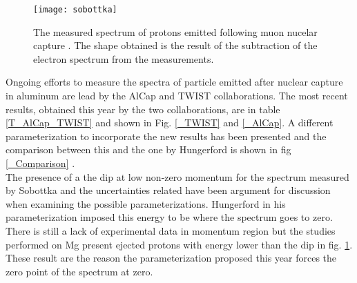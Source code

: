\documentclass[12pt,a4paper,openright, oneside, titlepage]{book} %
\begin{document}
\begin{figure}
\centering
\texttt{[image: sobottka]}
\caption{The measured spectrum of protons emitted following muon nucelar capture \cite{Sobottka}. The shape obtained is the result of the subtraction of the electron spectrum from the measurements.}
\label{_sobottka}
\end{figure}

\noindent Ongoing efforts to measure the spectra of particle emitted after nuclear capture in aluminum are lead by the AlCap \cite{AlCap:2018} and TWIST \cite{TWIST:2020} collaborations. 
The most recent results, obtained this year by the two collaborations, are in table \ref{T_AlCap_TWIST} and shown in Fig. \ref{_TWIST} and  \ref{_AlCap}. 
A different parameterization to incorporate the new results has been presented \cite{Pasha:spectra} and the comparison between this and the one by Hungerford is shown in fig \ref{_Comparison} \cite{io:comparison}.\\

\noindent The presence of a the dip at low non-zero momentum for the spectrum measured by Sobottka and the uncertainties related have been argument for discussion \cite{io:sobottka} when examining the possible parameterizations.  Hungerford in his parameterization imposed this energy to be where the spectrum goes to zero. 
There is still a lack of experimental data in momentum region but the studies performed on Mg \cite{IDS:2016} present ejected protons with energy lower than the dip in fig. \ref{_sobottka}. These result are the reason the parameterization proposed this year forces the zero point of the spectrum at zero.\\
\end{document}
